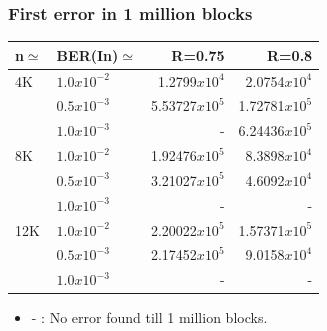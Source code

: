 \documentclass[xcolor=dvipsname]
{beamer}
\begin{document}
\begin{frame}[t] 
\frametitle{First error in 1 million blocks}

\begin{table}[]
\centering
\begin{tabular}{|l|l|r|r|}
\hline
n$\simeq$   & BER(In)$\simeq$    & R=0.75  & R=0.8  \\ \hline
4K  & $1.0x10^{-2}$  &  1.2799$x10^{4}$    & 2.0754$x10^{4}$           \\ 
    & $0.5x10^{-3}$  &  5.53727$x10^{5}$    &  1.72781$x10^{5}$       \\ 
    & $1.0x10^{-3}$   & -				   & 6.24436$x10^{5}$       \\ \hline
8K  & $1.0x10^{-2}$   & 1.92476$x10^{5}$   & 8.3898$x10^{4}$        \\ 
    & $0.5x10^{-3}$   & 3.21027$x10^{5}$     & 4.6092$x10^{4}$        \\ 
    & $1.0x10^{-3}$   & -				   & -                 \\ \hline
12K & $1.0x10^{-2}$   & 2.20022$x10^{5}$   & 1.57371$x10^{5}$          \\ 
    & $0.5x10^{-3}$   & 2.17452$x10^{5}$     & 9.0158$x10^{4}$        \\ 
    & $1.0x10^{-3}$   & -				     & -        \\ \hline   
\end{tabular}
\end{table}
\begin{itemize}
\item -	 : No error found till 1 million blocks. 
\end{itemize}
\end{frame}
\end{document}
